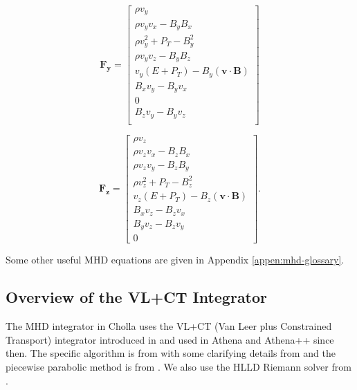 \begin{equation}
    \boldsymbol{F_y} = \begin{bmatrix}
            \rho v_{y} \\
            \rho v_{y} v_{x} - B_{y} B_{x} \\
            \rho v_{y}^2 + P_{T} - B_{y}^2 \\
            \rho v_{y} v_{z} - B_{y} B_{z} \\
            v_{y} \left( E + P_{T} \right) - B_{y} \left( \boldsymbol{v} \cdot \boldsymbol{B} \right) \\
            B_{x} v_{y} - B_{y} v_{x} \\
            0 \\
            B_{z} v_{y} - B_{y} v_{z} \\
         \end{bmatrix}
\end{equation}

\begin{equation}
    \boldsymbol{F_z} = \begin{bmatrix}
            \rho v_{z} \\
            \rho v_{z} v_{x} - B_{z} B_{x} \\
            \rho v_{z} v_{y} - B_{z} B_{y} \\
            \rho v_{z}^2 + P_{T} - B_{z}^2 \\
            v_{z} \left( E + P_{T} \right) - B_{z} \left( \boldsymbol{v} \cdot \boldsymbol{B} \right) \\
            B_{x} v_{z} - B_{z} v_{x} \\
            B_{y} v_{z} - B_{z} v_{y} \\
            0
         \end{bmatrix}.
\end{equation}

Some other useful MHD equations are given in Appendix \ref{appen:mhd-glossary}.



\subsection{Overview of the VL+CT Integrator}
\label{sec:vlct-summary}

The MHD integrator in Cholla uses the VL+CT (Van Leer plus Constrained Transport) integrator introduced in \cite{stone_2009} and used in Athena and Athena++ since then. The specific algorithm is from \cite{stone_2009} with some clarifying details from \cite{gardiner_2005,gardiner_unsplit_2008,stone_athena_2008} and the piecewise parabolic method is from \cite{felker_2020}. We also use the HLLD Riemann solver from \cite{hlld_2005}.

